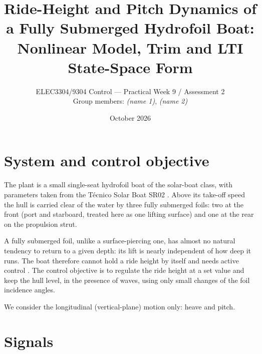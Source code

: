 \documentclass[11pt,a4paper]{article}
\title{Ride-Height and Pitch Dynamics of a Fully Submerged Hydrofoil Boat:\\
Nonlinear Model, Trim and LTI State-Space Form}
\author{ELEC3304/9304 Control --- Practical Week 9 / Assessment 2\\[2pt]
Group members: \emph{(name 1)}, \emph{(name 2)}}
\date{October 2026}
\begin{document}
\maketitle

\section{System and control objective}

The plant is a small single-seat hydrofoil boat of the solar-boat class, with
parameters taken from the T\'ecnico Solar Boat SR02 \cite{belime}. Above its
take-off speed the hull is carried clear of the water by three fully submerged
foils: two at the front (port and starboard, treated here as one lifting surface)
and one at the rear on the propulsion strut.

A fully submerged foil, unlike a surface-piercing one, has almost no natural
tendency to return to a given depth: its lift is nearly independent of how deep
it runs. The boat therefore cannot hold a ride height by itself and needs active
control \cite{belime}. The control objective is to regulate the ride height at a
set value and keep the hull level, in the presence of waves, using only small
changes of the foil incidence angles.

We consider the longitudinal (vertical-plane) motion only: heave and pitch.

\section{Signals}
\end{document}
